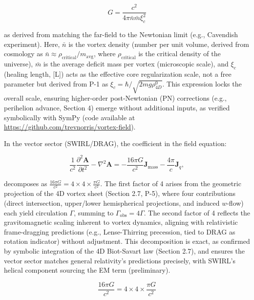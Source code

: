 \begin{equation}
G = \frac{c^2}{4\pi \bar{n} \bar{m} \xi_c^2}
\end{equation}

as derived from matching the far-field to the Newtonian limit (e.g., Cavendish experiment). Here, $\bar{n}$ is the vortex density (number per unit volume, derived from cosmology as $\bar{n} \approx \rho_{\text{critical}} / m_{\text{avg}}$, where $\rho_{\text{critical}}$ is the critical density of the universe), $\bar{m}$ is the average deficit mass per vortex (microscopic scale), and $\xi_c$ (healing length, [L]) acts as the effective core regularization scale, not a free parameter but derived from P-1 as $\xi_c = \hbar / \sqrt{2 m g \rho_{4D}^0}$. This expression locks the overall scale, ensuring higher-order post-Newtonian (PN) corrections (e.g., perihelion advance, Section 4) emerge without additional inputs, as verified symbolically with SymPy (code available at \url{https://github.com/trevnorris/vortex-field}).

In the vector sector (SWIRL/DRAG), the coefficient in the field equation:

\begin{equation}
\frac{1}{c^2} \frac{\partial^2 \mathbf{A}}{\partial t^2} - \nabla^2 \mathbf{A} = -\frac{16\pi G}{c^2} \mathbf{J}_{\text{mass}} - \frac{4\pi}{c} \mathbf{J}_q,
\end{equation}

decomposes as $\frac{16\pi G}{c^2} = 4 \times 4 \times \frac{\pi G}{c^2}$. The first factor of 4 arises from the geometric projection of the 4D vortex sheet (Section 2.7, P-5), where four contributions (direct intersection, upper/lower hemispherical projections, and induced $w$-flow) each yield circulation $\Gamma$, summing to $\Gamma_{\text{obs}} = 4\Gamma$. The second factor of 4 reflects the gravitomagnetic scaling inherent to vortex dynamics, aligning with relativistic frame-dragging predictions (e.g., Lense-Thirring precession, tied to DRAG as rotation indicator) without adjustment. This decomposition is exact, as confirmed by symbolic integration of the 4D Biot-Savart law (Section 2.7), and ensures the vector sector matches general relativity's predictions precisely, with SWIRL's helical component sourcing the EM term (preliminary).

\begin{equation}
\frac{16\pi G}{c^2} = 4 \times 4 \times \frac{\pi G}{c^2}
\end{equation}

